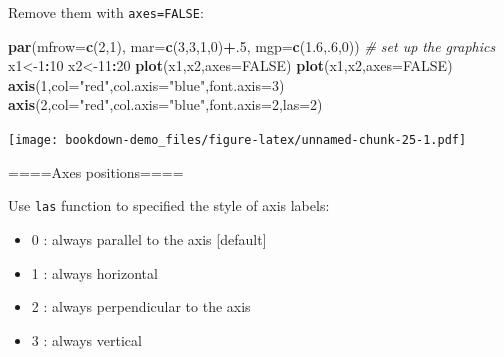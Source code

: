 \documentclass[]{book}
\newenvironment{Shaded}{\begin{snugshade}}{\end{snugshade}}
\newcommand{\KeywordTok}[1]{\textcolor[rgb]{0.13,0.29,0.53}{\textbf{#1}}}
\newcommand{\DataTypeTok}[1]{\textcolor[rgb]{0.13,0.29,0.53}{#1}}
\newcommand{\DecValTok}[1]{\textcolor[rgb]{0.00,0.00,0.81}{#1}}
\newcommand{\FloatTok}[1]{\textcolor[rgb]{0.00,0.00,0.81}{#1}}
\newcommand{\StringTok}[1]{\textcolor[rgb]{0.31,0.60,0.02}{#1}}
\newcommand{\CommentTok}[1]{\textcolor[rgb]{0.56,0.35,0.01}{\textit{#1}}}
\newcommand{\OtherTok}[1]{\textcolor[rgb]{0.56,0.35,0.01}{#1}}
\newcommand{\OperatorTok}[1]{\textcolor[rgb]{0.81,0.36,0.00}{\textbf{#1}}}
\newcommand{\NormalTok}[1]{#1}
\begin{document}
Remove them with \texttt{axes=FALSE}:

\begin{Shaded}
\begin{Highlighting}[]
\KeywordTok{par}\NormalTok{(}\DataTypeTok{mfrow=}\KeywordTok{c}\NormalTok{(}\DecValTok{2}\NormalTok{,}\DecValTok{1}\NormalTok{), }\DataTypeTok{mar=}\KeywordTok{c}\NormalTok{(}\DecValTok{3}\NormalTok{,}\DecValTok{3}\NormalTok{,}\DecValTok{1}\NormalTok{,}\DecValTok{0}\NormalTok{)}\OperatorTok{+}\NormalTok{.}\DecValTok{5}\NormalTok{, }\DataTypeTok{mgp=}\KeywordTok{c}\NormalTok{(}\FloatTok{1.6}\NormalTok{,.}\DecValTok{6}\NormalTok{,}\DecValTok{0}\NormalTok{))  }\CommentTok{# set up the graphics}
\NormalTok{x1<-}\DecValTok{1}\OperatorTok{:}\DecValTok{10}
\NormalTok{x2<-}\DecValTok{11}\OperatorTok{:}\DecValTok{20}
\KeywordTok{plot}\NormalTok{(x1,x2,}\DataTypeTok{axes=}\OtherTok{FALSE}\NormalTok{)}
\KeywordTok{plot}\NormalTok{(x1,x2,}\DataTypeTok{axes=}\OtherTok{FALSE}\NormalTok{)}
\KeywordTok{axis}\NormalTok{(}\DecValTok{1}\NormalTok{,}\DataTypeTok{col=}\StringTok{"red"}\NormalTok{,}\DataTypeTok{col.axis=}\StringTok{"blue"}\NormalTok{,}\DataTypeTok{font.axis=}\DecValTok{3}\NormalTok{)}
\KeywordTok{axis}\NormalTok{(}\DecValTok{2}\NormalTok{,}\DataTypeTok{col=}\StringTok{"red"}\NormalTok{,}\DataTypeTok{col.axis=}\StringTok{"blue"}\NormalTok{,}\DataTypeTok{font.axis=}\DecValTok{2}\NormalTok{,}\DataTypeTok{las=}\DecValTok{2}\NormalTok{)}
\end{Highlighting}
\end{Shaded}

\texttt{[image: bookdown-demo\_files/figure-latex/unnamed-chunk-25-1.pdf]}

====Axes positions====

Use \texttt{las} function to specified the style of axis labels:

\begin{itemize}
\item
  0 : always parallel to the axis {[}default{]}
\item
  1 : always horizontal
\item
  2 : always perpendicular to the axis
\item
  3 : always vertical
\end{itemize}
\end{document}
